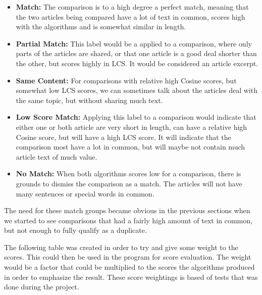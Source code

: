 \begin{itemize}
\item \textbf{Match:} The comparison is to a high degree a perfect match, meaning that the two articles being compared have a lot of text in common, scores high with the algorithms and is somewhat similar in length.
\item \textbf{Partial Match:} This label would be a applied to a comparison, where only parts of the articles are shared, or that one article is a good deal shorter than the other, but scores highly in LCS. It would be considered an article excerpt.
\item \textbf{Same Content:} For comparisons with relative high Cosine scores, but somewhat low LCS scores, we can sometimes talk about the articles deal with the same topic, but without sharing much text. 
\item \textbf{Low Score Match:} Applying this label to a comparison would indicate that either one or both article are very short in length, can have a relative high Cosine score, but will have a high LCS score. It will indicate that the comparison most have a lot in common, but will maybe not contain much article text of much value.
\item \textbf{No Match:} When both algorithms scores low for a comparison, there is grounds to dismiss the comparison as a match. The articles will not have many sentences or special words in common.
\end{itemize}

The need for these match groups became obvious in the previous sections when we started to see comparisons that had a fairly high amount of text in common, but not enough to fully qualify as a duplicate.

The following table was created in order to try and give some weight to the scores. This could then be used in the program for score evaluation. The weight would be a factor that could be multiplied to the scores the algorithms produced in order to emphasize the result. These score weightings is based of tests that was done during the project.

